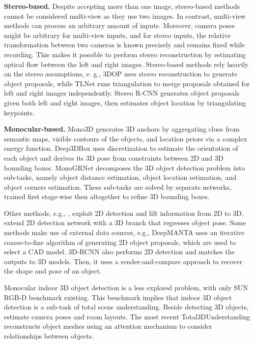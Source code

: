 \documentclass[10pt,twocolumn,letterpaper]{article}
\begin{document}
\textbf{Stereo-based.} Despite accepting more than one image, stereo-based methods cannot be considered multi-view as they use two images. In contrast, multi-view methods can process an arbitrary amount of inputs. Moreover, camera poses might be arbitrary for multi-view inputs, and for stereo inputs, the relative transformation between two cameras is known precisely and remains fixed while recording. This makes it possible to perform stereo reconstruction by estimating optical flow between the left and right images. Stereo-based methods rely heavily on the stereo assumptions, e. g., 3DOP \cite{chen20153dop} uses stereo reconstruction to generate object proposals, while TLNet \cite{qin2019triangulation} runs triangulation to merge proposals obtained for left and right images independently. Stereo R-CNN \cite{li2019stereorcnn} generates object proposals given both left and right images, then estimates object location by triangulating keypoints. 

\textbf{Monocular-based.} Mono3D \cite{chen2016mono3d} generates 3D anchors by aggregating clues from semantic maps, visible contours of the objects, and location priors via a complex energy function. Deep3DBox \cite{mousavian2017deep3dbox} uses discretization to estimate the orientation of each object and derives its 3D pose from constraints between 2D and 3D bounding boxes. MonoGRNet \cite{qin2019monogrnet} decomposes the 3D object detection problem into sub-tasks, namely object distance estimation, object location estimation, and object corners estimation. These sub-tasks are solved by separate networks, trained first stage-wise then altogether to refine 3D bounding boxes.

Other methods, e.g., \cite{chabot2017deepmanta, huang2018cooperative, nie2020total3dunderstanding}, exploit 2D detection and lift information from 2D to 3D. \cite{huang2018holistic, huang2018cooperative, nie2020total3dunderstanding} extend 2D detection network with a 3D branch that regresses object pose. Some methods make use of external data sources, e.g., DeepMANTA \cite{chabot2017deepmanta} uses an iterative coarse-to-fine algorithm of generating 2D object proposals, which are used to select a CAD model. 3D-RCNN \cite{kundu20183drcnn} also performs 2D detection and matches the outputs to 3D models. Then, it uses a render-and-compare approach to recover the shape and pose of an object. 

Monocular indoor 3D object detection is a less explored problem, with only SUN RGB-D \cite{song2015sunrgbd} benchmark existing. This benchmark implies that indoor 3D object detection is a sub-task of total scene understanding. Beside detecting 3D objects, \cite{huang2018holistic, huang2018cooperative, nie2020total3dunderstanding} estimate camera poses and room layouts. The most recent Total3DUnderstanding \cite{nie2020total3dunderstanding} reconstructs object meshes using an attention mechanism to consider relationships between objects.
\end{document}
